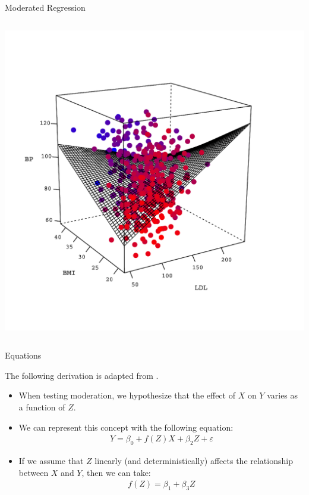 \documentclass{beamer}\usepackage[]{graphicx}\usepackage[]{color}
\begin{document}
\begin{frame}{Moderated Regression}
\begin{columns}
    \begin{column}{0.45\textwidth}
      \includegraphics[width = 1.1\textwidth]{figures/response_surface_plot}
    \end{column}
  \end{columns}
  
\end{frame}

\watermarkon %

\begin{frame}{Equations}
  
  The following derivation is adapted from \citet{hayes:2017}.
  \vb
  \begin{itemize}
  \item When testing moderation, we hypothesize that the effect of $X$ on $Y$ 
    varies as a function of $Z$.  
    \vb
  \item We can represent this concept with the following equation:
    \begin{align}
      Y = \beta_0 + f(Z)X + \beta_2Z + \varepsilon \label{fEq}
    \end{align}
    \pause
  \item If we assume that $Z$ linearly (and deterministically) affects the 
    relationship between $X$ and $Y$, then we can take:
    \begin{align}
      f(Z) = \beta_1 + \beta_3Z \label{ssEq}
    \end{align}
  \end{itemize}
  
\end{frame}
\end{document}
